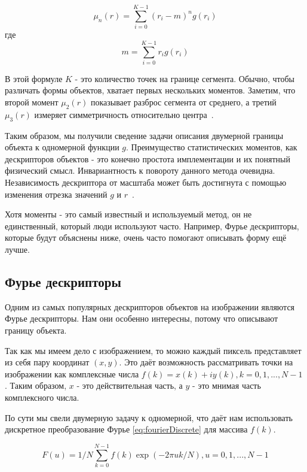 \begin{equation}\label{eq:nth_moment}
\mu_n(r)=\sum_{i=0}^{K-1}(r_i - m)^n g(r_i)
\end{equation}
где
\begin{equation}\label{eq:mean}
m=\sum_{i=0}^{K-1}r_i g(r_i)
\end{equation}

В этой формуле $K$ - это количество точек на границе сегмента. Обычно, чтобы различать формы объектов, хватает первых нескольких моментов. Заметим, что второй момент $\mu_2(r)$ показывает разброс сегмента от среднего, а третий $\mu_3(r)$ измеряет симметричность относительно центра~\cite{gonzalez2012digital}.

Таким образом, мы получили сведение задачи описания двумерной границы объекта к одномерной функции $g$. Преимущество статистических моментов, как дескрипторов объектов - это конечно простота имплементации и их понятный физический смысл. Инвариантность к повороту данного метода очевидна. Независимость дескриптора от масштаба может быть достигнута с помощью изменения отрезка значений $g$ и $r$~\cite{gonzalez2012digital}.

Хотя моменты - это самый известный и используемый метод, он не единственный, который люди используют часто. Например, Фурье дескрипторы, которые будут объяснены ниже, очень часто помогают описывать форму ещё лучше. 

\subsection{Фурье дескрипторы}

Одним из самых популярных дескрипторов объектов на изображении являются Фурье дескрипторы. Нам они особенно интересны, потому что описывают границу объекта.

Так как мы имеем дело с изображением, то можно каждый пиксель представляет из себя пару координат $(x, y)$. Это даёт возможность рассматривать точки на изображении как комплексные числа $f(k) = x(k) + iy(k), k = 0,1,...,N-1$ \cite{kolyuchkin2013visionAlgorithms}. Таким образом, $x$ - это действительная часть, а $y$ - это мнимая часть комплексного числа.

По сути мы свели двумерную задачу к одномерной, что даёт нам использовать дискретное преобразование Фурье \eqref{eq:fourierDiscrete} для массива $f(k)$.

\begin{equation}\label{eq:fourierDiscrete}
F(u) = 1/N \sum_{k=0}^{N-1} f(k) \exp(- 2\pi u k / N), u = 0,1,...,N-1
\end{equation}

